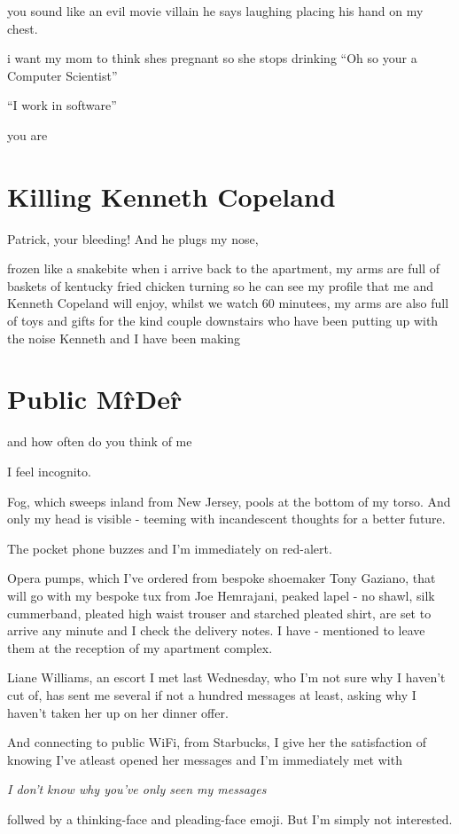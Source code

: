 \documentclass[19pt,openany]{book}
\begin{document}
you sound like an evil movie villain he says laughing
placing his hand on my chest.

i want my mom to think shes pregnant so she stops drinking
``Oh so your a Computer
Scientist''

``I work in software''

you are
\chapter{Killing Kenneth
Copeland}

Patrick, your bleeding!
And he plugs my nose,

frozen like a snakebite
when i arrive back to the apartment,
my arms are full of baskets
of kentucky fried chicken
turning so he can see my profile
that me and Kenneth
Copeland will enjoy, whilst
we watch 60 minutees,
my arms are also full of toys
and gifts for the kind couple downstairs
who have been putting up with the noise
Kenneth and I have been making
\chapter*{Public M\^rDe\^r}
and how often do you think of me

I feel incognito.

Fog, which
sweeps inland from
New Jersey, pools at the
bottom of my torso. And
only my head is visible -
teeming with incandescent
thoughts for a better
future.

The pocket phone buzzes and I'm immediately
on red-alert.

Opera pumps, which I've ordered
from bespoke shoemaker Tony
Gaziano, that will go with my
bespoke tux from Joe Hemrajani,
peaked lapel - no shawl, silk cummerband,
pleated high waist trouser
and starched pleated shirt, are
set to arrive any minute and I check
the delivery notes. I have - mentioned
to leave them at the reception
of my apartment complex.

Liane Williams, an
escort I met last
Wednesday, who I'm
not sure why I haven't cut of,
has sent me several if not
a hundred messages at least,
asking why I haven't taken
her up on her dinner offer.

And connecting to public WiFi,
from Starbucks, I give her
the satisfaction of knowing
I've atleast opened her messages
and I'm immediately met with

\textit{I don't know why you've only
seen my messages}

follwed by
a thinking-face and pleading-face
emoji. But I'm simply not interested.
\end{document}
